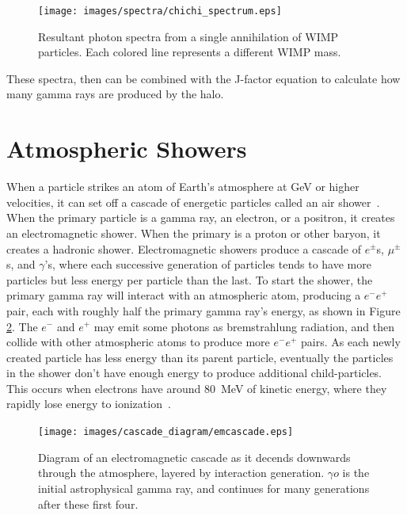     \begin{figure}[ht]
      \centering
      \texttt{[image: images/spectra/chichi\_spectrum.eps]}
      \caption[Single Annihilation Spectra]{
        Resultant photon spectra from a single annihilation of WIMP particles.
        Each colored line represents a different WIMP mass.}
      \label{fig:chichi_spectrum}
    \end{figure}

    These spectra, then can be combined with the J-factor equation to calculate how many gamma rays are produced by the halo.

    \FloatBarrier
    
    
\section{Atmospheric Showers}

  When a particle strikes an atom of Earth's atmosphere at GeV or higher velocities, it can set off a cascade of energetic particles called an air shower~\cite{Bethe1934,Klein1999}.
  When the primary particle is a gamma ray, an electron, or a positron, it creates an electromagnetic shower.
  When the primary is a proton or other baryon, it creates a hadronic shower.
  Electromagnetic showers produce a cascade of $e^{\pm}$s, $\mu^{\pm}$s, and $\gamma$'s, where each successive generation of particles tends to have more particles but less energy per particle than the last.
  To start the shower, the primary gamma ray will interact with an atmospheric atom, producing a $e^{-}e^{+}$ pair, each with roughly half the primary gamma ray's energy, as shown in Figure \ref{fig:emcascade}.
  The $e^{-}$ and $e^{+}$ may emit some photons as bremstrahlung radiation, and then collide with other atmospheric atoms to produce more $e^{-}e^{+}$ pairs.
  As each newly created particle has less energy than its parent particle, eventually the particles in the shower don't have enough energy to produce additional child-particles.
  This occurs when electrons have around \SI{80}{MeV} of kinetic energy, where they rapidly lose energy to ionization~\cite{pdg_2014}.

  \begin{figure}[ht]
    \centering
    \texttt{[image: images/cascade\_diagram/emcascade.eps]}
    \caption[Electromagnetic Cascade]{
      Diagram of an electromagnetic cascade as it decends downwards through the atmosphere, layered by interaction generation.
      $\gamma{}o$ is the initial astrophysical gamma ray, and continues for many generations after these first four.
    }
    \label{fig:emcascade}
  \end{figure}
  
